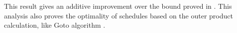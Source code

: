 \documentclass[sigplan,review,anonymous]{acmart}\settopmatter{printfolios=true,printccs=false,printacmref=false}
\begin{document}
This result gives an additive improvement over the bound proved in 
\cite{tightMMM}. This analysis also proves the optimality of schedules based on 
the 
outer product 
calculation, like Goto algorithm 
\cite{Goto}.


%
%
%
%
\end{document}
